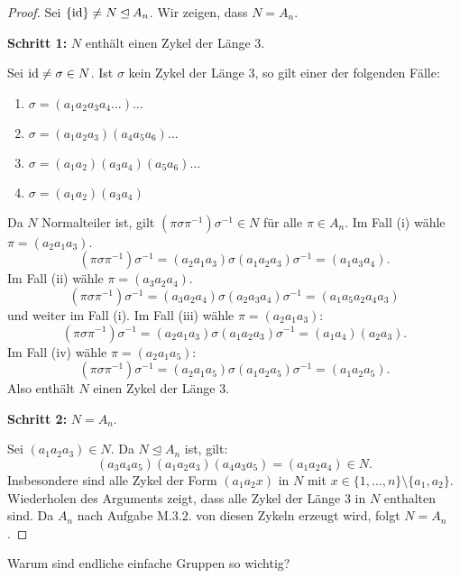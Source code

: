 \begin{proof}
	Sei $\{\mathrm{id}\} \neq N \unlhd A_n$. Wir zeigen, dass $N = A_n$. 
	
	\textbf{Schritt 1: } $N$ enthält einen Zykel der Länge 3. 
	
	Sei $\mathrm{id} \neq \sigma \in N$. Ist $\sigma$ kein Zykel der Länge 3, so gilt einer der folgenden Fälle:
	\begin{enumerate}[label=(\roman*)]
		\item $\sigma = (a_1 a_2 a_3 a_4 \dots)\dots$
		\item $\sigma = (a_1 a_2 a_3)(a_4 a_5 a_6)\dots$
		\item $\sigma = (a_1 a_2)(a_3 a_4)(a_5 a_6)\dots$
		\item $\sigma = (a_1 a_2)(a_3 a_4)$
	\end{enumerate}
	Da $N$ Normalteiler ist, gilt $(\pi \sigma \pi^{-1})\sigma^{-1} \in N$ für alle $\pi \in A_n$. Im Fall (i) wähle $\pi = (a_2 a_1 a_3)$.
	\[(\pi \sigma \pi^{-1})\sigma^{-1} = (a_2 a_1 a_3)\sigma(a_1 a_2 a_3)\sigma^{-1} = (a_1 a_3 a_4).\]
	Im Fall (ii) wähle $\pi = (a_3 a_2 a_4)$.
	\[(\pi\sigma\pi^{-1})\sigma^{-1} = (a_3 a_2 a_4)\sigma(a_2a_3a_4)\sigma^{-1} = (a_1 a_5 a_2 a_4 a_3)\]
	und weiter im Fall (i). Im Fall (iii) wähle $\pi = (a_2 a_1 a_3)$:
	\[(\pi\sigma\pi^{-1}) \sigma^{-1} = (a_2 a_1 a_3)\sigma(a_1 a_2 a_3) \sigma^{-1} = (a_1 a_4)(a_2 a_3).\]
	Im Fall (iv) wähle $\pi = (a_2 a_1 a_5)$:
	\[(\pi\sigma\pi^{-1})\sigma^{-1} = (a_2 a_1 a_5)\sigma(a_1 a_2 a_5)\sigma^{-1} = (a_1 a_2 a_5).\]
	Also enthält $N$ einen Zykel der Länge 3.
	
	\textbf{Schritt 2: } $N = A_n$.
	
	Sei $(a_1 a_2 a_3) \in N$. Da $N \unlhd A_n$ ist, gilt:
	\[(a_3 a_4 a_5)(a_1 a_2 a_3)(a_4 a_3 a_5) = (a_1 a_2 a_4) \in N.\]
	Insbesondere sind alle Zykel der Form $(a_1 a_2 x)$ in $N$ mit $x \in \{1,\dots, n\} \setminus \{a_1, a_2\}$. Wiederholen des Arguments zeigt, dass alle Zykel der Länge 3 in $N$ enthalten sind. Da $A_n$ nach Aufgabe M.3.2. von diesen Zykeln erzeugt wird, folgt $N = A_n$.
\end{proof}
\begin{leftbar}
	{Warum sind endliche einfache Gruppen so wichtig?}
\end{leftbar}

